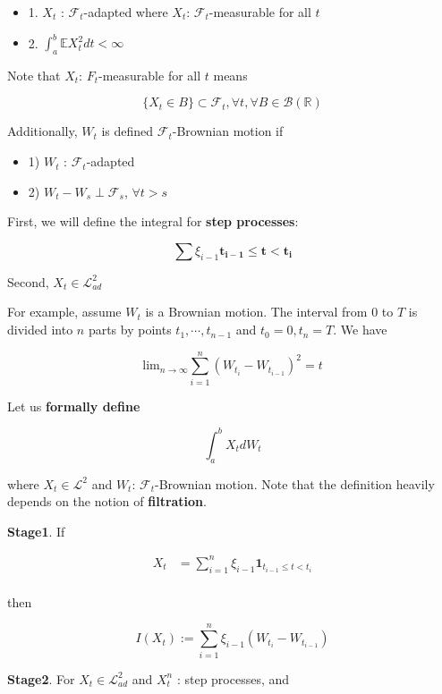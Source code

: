 \documentclass[12pt]{article}
\theoremstyle{nonumberbreak}
\begin{document}
\begin{itemize}
	\item 1. $X_t$ : $\mathcal{F}_t$-adapted where $X_t$: $\mathcal{F}_t$-measurable for all $t$
	\item 2. $\int_a^b \mathbb{E}X_t^2 dt < \infty $
\end{itemize}

Note that $X_t$: $F_t$-measurable for all $t$ means

$$
\{ X_t \in B\} \subset \mathcal{F}_t, \forall t, \forall B \in \mathcal{B}(\mathbb{R})
$$

Additionally, $W_t$ is defined $\mathcal{F}_t$-Brownian motion if 

\begin{itemize}
	\item 1) $W_t$ : $\mathcal{F}_t$-adapted
	\item 2) $W_t - W_s \perp \mathcal{F}_s$, $\forall t > s$
\end{itemize}

First, we will define the integral for \textbf{step processes}: 

$$
\sum \xi_{i-1} \mathbf{t_{i-1} \le t < t_i}
$$

Second, $X_t \in \mathcal{L}^2_{ad}$


For example, assume $W_t$ is a Brownian motion. The interval from $0$ to $T$ is divided into $n$ parts by points $t_1,\cdots,t_{n-1}$ and $t_0=0,t_n=T$. We have

$$
\mathrm{lim}_{n\to\infty} \sum_{i=1}^n \left( W_{t_i} - W_{t_{i-1}} \right)^2 = t
$$


Let us \textbf{formally define} 

$$
\int_a^b X_t dW_t
$$

where $X_t \in \mathcal{L}^2$ and $W_t$: $\mathcal{F}_t$-Brownian motion. Note that the definition heavily depends on the notion of \textbf{filtration}. 

\textbf{Stage1}. If

$$
\begin{aligned}
X_t &= \sum_{i=1}^n \xi_{i-1} \mathbf{1}_{t_{i-1} \le t < t_i} \\[8pt]
\end{aligned}
$$

then

$$
I (X_t) := \sum_{i=1}^n \xi_{i-1} \left( W_{t_i} - W_{t_{i-1}} \right)
$$

\textbf{Stage2}. For $X_t \in \mathcal{L}^2_{ad}$ and $X_t^n$ : step processes, and 
\end{document}
